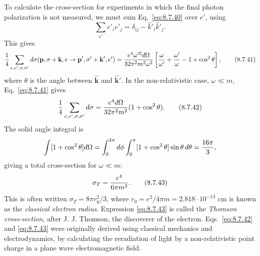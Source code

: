 To calculate the cross-section for experiments in which the final photon
polarization is not measured, we must sum Eq.~\eqref{eq:8.7.40} over $e'$, using
\[
\sum_{e'}e'_i e'_j=\delta_{ij}-\hat k'_i\hat k'_j.
\]
This gives
\begin{equation}
{1\over4}\sum_{e,e',\sigma,\sigma'}d\sigma(\mathbf p,\sigma+\mathbf k,e
\to\mathbf p',\sigma'+\mathbf k',e')
={e^4\omega'^2d\Omega\over32\pi^2m^2\omega^2}
\left[{\omega\over\omega'}+{\omega'\over\omega}-1+\cos^2\theta\right],
\tag{8.7.41}\label{eq:8.7.41}
\end{equation}
where $\theta$ is the angle between $\hat{\mathbf k}$ and
$\hat{\mathbf k}'$. In the non-relativistic case, $\omega\ll m$,
Eq.~\eqref{eq:8.7.41} gives
\begin{equation}
{1\over4}\sum_{e,e',\sigma,\sigma'}d\sigma
={e^4d\Omega\over32\pi^2m^2}(1+\cos^2\theta).
\tag{8.7.42}\label{eq:8.7.42}
\end{equation}
The solid angle integral is
\[
\int[1+\cos^2\theta]d\Omega
=\int_0^{2\pi}d\phi\int_0^\pi[1+\cos^2\theta]\sin\theta\,d\theta
={16\pi\over3},
\]
giving a total cross-section for $\omega\ll m$:
\begin{equation}
\sigma_T={e^4\over6\pi m^2}.
\tag{8.7.43}\label{eq:8.7.43}
\end{equation}
This is often written $\sigma_T=8\pi r_0^2/3$, where
$r_0=e^2/4\pi m=2.818\cdot10^{-13}$ cm is known as the \emph{classical
electron radius}. Expression \eqref{eq:8.7.43} is called the \emph{Thomson
cross-section}, after J. J. Thomson, the discoverer of the electron.
Eqs.~\eqref{eq:8.7.42} and \eqref{eq:8.7.43} were originally derived using classical mechanics
and electrodynamics, by calculating the reradiation of light by a
non-relativistic point charge in a plane wave electromagnetic field.
